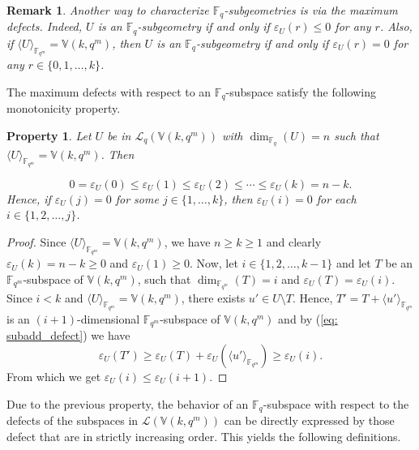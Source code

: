 \documentclass[11pt]{amsart}
\newtheorem{remark}[theorem]{Remark}
\newtheorem{property}[theorem]{Property}
\newcommand{\fqm}{\mathbb{F}_{q^m}}
\newcommand{\fq}{{\mathbb F}_{q}}
\begin{document}
\begin{remark}
  Another way to characterize $\fq$-subgeometries is via the maximum defects. Indeed, $U$ is an $\fq$-subgeometry if and only if $\varepsilon_U(r)\leq 0$ for any $r$.  Also, if $\langle U\rangle_{\fqm}=\mathbb{V}(k,q^m)$, then $U$ is an $\fq$-subgeometry if and only if $\varepsilon_U(r)= 0$ for any $r\in \{0,1,\dots, k\}$.
\end{remark}

The maximum defects with respect to an $\fq$-subspace satisfy the following monotonicity property.



\begin{property} \label{prop: monotonicity_maxi_defect}
Let $U$ be in $\mathcal{L}_q(\mathbb{V}(k,q^m))$ with $\dim_{\fq} (U)=n$  such that $\langle U\rangle_{\fqm}=\mathbb{V}(k,q^m)$. Then


  \begin{equation} \label{eq:monotonicity_defects}
   0=\varepsilon_U(0) \leq  \varepsilon_U(1) \leq \varepsilon_U(2)\leq \cdots \leq \varepsilon_U(k)=n-k.
\end{equation}
 Hence,  if $\varepsilon_U(j) = 0$ for some $j\in  \{1,\dots,k\}$, then $\varepsilon_U(i) = 0$ for each $i\in \{1,2,\dots,j\}$.   
\end{property}
\begin{proof}
Since $\langle U\rangle_{\fqm}=\mathbb{V}(k,q^m)$, we have $n\geq k\geq 1$ and clearly $\varepsilon_U(k)=n-k\geq 0$ and $\varepsilon_U(1)\geq 0$. Now, let $i\in\{1,2,\dots,k-1\}$ and let $T$ be an $\fqm$-subspace of $\mathbb{V}(k,q^m)$, such that $\dim_{\fqm}(T)=i$ and  $\varepsilon_U(T)=\varepsilon_U(i)$.
Since $i<k$ and $\langle U\rangle_{\fqm}=\mathbb{V}(k,q^m)$, there exists $u'\in U\setminus T$. Hence, $T'=T+\langle  u'\rangle_{\fqm}$ is an $(i+1)$-dimensional $\fqm$-subspace of $\mathbb{V}(k,q^m)$ and by (\ref{eq: subadd_defect}) we have  
\[\varepsilon_U(T')\geq \varepsilon_U(T)+\varepsilon_U(\langle  u'\rangle_{\fqm})\geq \varepsilon_U(i).\]
From which we get $\varepsilon_U(i)\leq \varepsilon_U(i+1)$.   
\end{proof}

Due to the previous property, the behavior of an $\fq$-subspace with respect to the defects of the subspaces in ${\mathcal L}(\mathbb{V}(k,q^m))$ can be directly expressed by those defect that are in strictly increasing order. This yields the following definitions.
\end{document}

